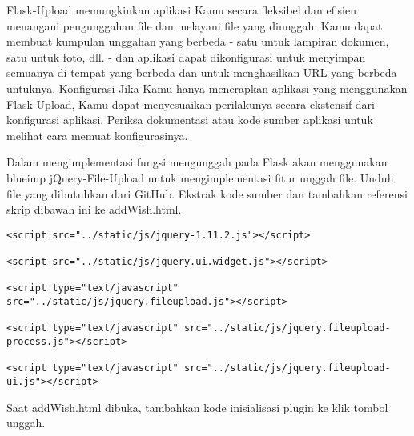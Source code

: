 \documentclass[12pt,a4paper]{article}
\begin{document}
Flask-Upload memungkinkan aplikasi Kamu secara fleksibel dan efisien menangani pengunggahan file dan melayani file yang diunggah. Kamu dapat membuat kumpulan unggahan yang berbeda - satu untuk lampiran dokumen, satu untuk foto, dll. - dan aplikasi dapat dikonfigurasi untuk menyimpan semuanya di tempat yang berbeda dan untuk menghasilkan URL yang berbeda untuknya.
Konfigurasi
Jika Kamu hanya menerapkan aplikasi yang menggunakan Flask-Upload, Kamu dapat menyesuaikan perilakunya secara ekstensif dari konfigurasi aplikasi. Periksa dokumentasi atau kode sumber aplikasi untuk melihat cara memuat konfigurasinya.


Dalam mengimplementasi fungsi mengunggah pada Flask akan menggunakan blueimp jQuery-File-Upload untuk mengimplementasi fitur unggah file. Unduh file yang dibutuhkan dari GitHub. Ekstrak kode sumber dan tambahkan referensi skrip dibawah ini ke addWish.html.
\begin{verbatim}
<script src="../static/js/jquery-1.11.2.js"></script>
 
<script src="../static/js/jquery.ui.widget.js"></script>
 
<script type="text/javascript" src="../static/js/jquery.fileupload.js"></script>
 
<script type="text/javascript" src="../static/js/jquery.fileupload-process.js"></script>
 
<script type="text/javascript" src="../static/js/jquery.fileupload-ui.js"></script>
\end{verbatim}

Saat addWish.html dibuka, tambahkan kode inisialisasi plugin ke klik tombol unggah.
\end{document}
